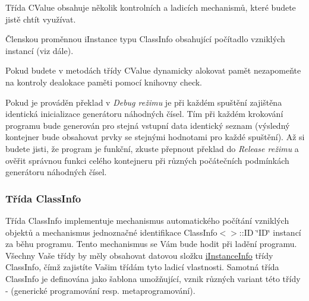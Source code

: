 Třída C\+Value obsahuje několik kontrolních a ladicích mechanismů, které budete jistě chtít využívat.

\begin{DoxyItemize}
\item Členskou proměnnou {\ttfamily i\+Instance} typu {\ttfamily Class\+Info} obsahující počítadlo vzniklých instancí (viz dále). \item Pokud budete v metodách třídy C\+Value dynamicky alokovat pamět nezapomeňte na kontroly dealokace paměti pomocí knihovny check. \item Pokud je prováděn překlad v {\itshape Debug režimu} je při každém spuštění zajištěna identická inicializace generátoru náhodných čísel. Tím při každém krokování programu bude generován pro stejná vstupní data identický seznam (výsledný kontejner bude obsahovat prvky se stejnými hodnotami pro každé spuštění). Až si budete jisti, že program je funkční, zkuste přepnout překlad do {\itshape Release režimu} a ověřit správnou funkci celého kontejneru při různých počátečních podmínkách generátoru náhodných čísel.\end{DoxyItemize}
\subsubsection*{Třída Class\+Info}

Třída Class\+Info implementuje mechanismus automatického počítání vzniklých objektů a mechanismus jednoznačné identifikace Class\+Info$<$$>$\+::\+ID \char`\"{}\+I\+D\char`\"{} instancí za běhu programu. Tento mechanismus se Vám bude hodit při ladění programu. Všechny Vaše třídy by měly obsahovat datovou složku \hyperlink{class_c_value__bool_1_1_c_value_a5e9470a5efc80373b5cc943f25d1a803}{i\+Instance\+Info} třídy Class\+Info, čímž zajistíte Vašim třídám tyto ladicí vlastnosti. Samotná třída Class\+Info je definována jako šablona umožňující, vznik různých variant této třídy -\/ (generické programování resp. metaprogramování).

